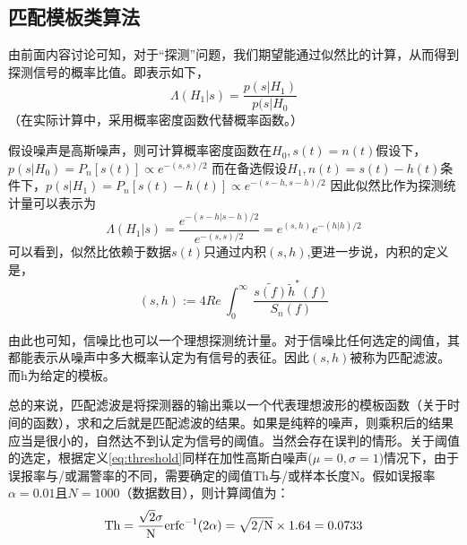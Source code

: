 \subsection{匹配模板类算法}
由前面内容讨论可知，对于“探测”问题，我们期望能通过似然比的计算，从而得到探测信号的概率比值。即表示如下，
\begin{equation}
\Lambda (H_1|s)= \frac{p(s|H_1)}{p(s|H_0}
\end{equation}
（在实际计算中，采用概率密度函数代替概率函数。）

假设噪声是高斯噪声，则可计算概率密度函数在$H_0,s(t)=n(t)$假设下，$p(s|H_0) =P_n[s(t)]\propto e^{-(s,s)/2}$
而在备选假设$H_1,n(t)=s(t)-h(t)$条件下，$p(s|H_1) =P_n[s(t)-h(t)]\propto e^{-(s-h,s-h)/2}$
因此似然比作为探测统计量可以表示为
\begin{equation}
\Lambda (H_1|s)=\frac{e^{-(s-h|s-h)/2}}{e^{-(s,s)/2}}=e^{(s,h)}e^{-(h|h)/2}
\end{equation}
可以看到，似然比依赖于数据$s(t)$只通过内积$(s,h)$,更进一步说，内积的定义是，
\begin{equation}
(s,h):=4Re\ \int^{\infty}_0 \ \frac{\tilde{s(f)}\tilde{ h}^{\ast}(f)}{S_n(f)}
\end{equation}

由此也可知，信噪比也可以一个理想探测统计量。对于信噪比任何选定的阈值，其都能表示从噪声中多大概率认定为有信号的表征。因此$(s,h)$被称为匹配滤波。而h为给定的模板。



总的来说，匹配滤波是将探测器的输出乘以一个代表理想波形的模板函数（关于时间的函数），求和之后就是匹配滤波的结果。如果是纯粹的噪声，则乘积后的结果应当是很小的，自然达不到认定为信号的阈值。当然会存在误判的情形。关于阈值的选定，根据定义\ref{eq:threshold}同样在加性高斯白噪声($\mu=0,\sigma=1$)情况下，由于误报率与/或漏警率的不同，需要确定的阈值Th与/或样本长度N。假如误报率$\alpha=0.01$且$N=1000$（数据数目），则计算阈值为：
\begin{equation}
\rm Th=\frac{\sqrt{2}\sigma}{N}\rm erfc^{-1}(2\alpha)=\sqrt{2/N} \times 1.64 =0.0733
\end{equation}


